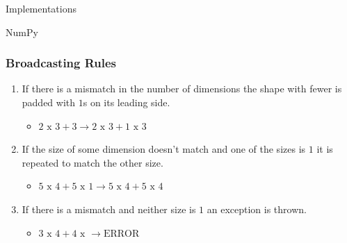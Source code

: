 \documentclass{beamer}
\theoremstyle{case}
\begin{document}
\begin{section}{Implementations}
\begin{subsection}{NumPy}
\begin{frame}
    \frametitle{Broadcasting Rules}
    \begin{enumerate}
        \item If there is a mismatch in the number of dimensions the shape with fewer is padded with $1$s on its leading side.
            \begin{itemize}
                \item $2 \text{ x } 3 + 3 \rightarrow 2 \text{ x } 3 + 1 \text{ x } 3$
            \end{itemize}
        \item If the size of some dimension doesn't match and one of the sizes is $1$ it is repeated to match the other size.
            \begin{itemize}
                \item $5 \text{ x } 4 + 5 \text{ x } 1 \rightarrow 5 \text{ x } 4 + 5 \text{ x } 4$
            \end{itemize}
        \item If there is a mismatch and neither size is $1$ an exception is thrown.
            \begin{itemize}
                \item $3 \text{ x } 4 + 4 \text{ x } \rightarrow \text{ERROR}$
            \end{itemize}
    \end{enumerate}
\end{frame}


\end{subsection}
\end{section}
\end{document}
